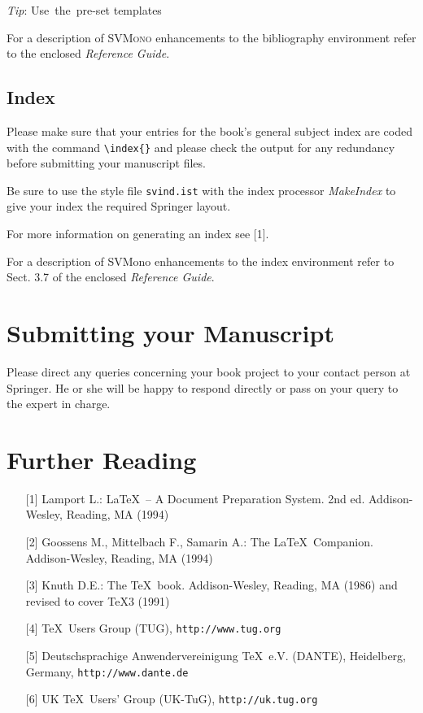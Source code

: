 \documentclass[graybox]{svmono}
\begin{document}
\vspace*{-4.5pc}
\hspace*{29.5pc}\emph{Tip}:
\hspace*{29.5pc}\mbox{Use the pre-set}
\hspace*{29.5pc}\mbox{templates}

\vspace*{3pc}
For a description of \textsc{SVMono} enhancements to the bibliography environment refer to the enclosed \emph{Reference Guide}.

\subsection{Index}

Please make sure that your entries for the book's general subject index are coded with the command \verb|\index{}| and please check the output for any redundancy before submitting your manuscript files.

Be sure to use the style file \verb|svind.ist| with the index processor {\it MakeIndex} to give your index the required Springer layout.

For more information on generating an index see [1].

For a description of {\sc SVMono} enhancements to the index environment refer to Sect. 3.7 of the enclosed {\it Reference Guide}.


\section{ Submitting your Manuscript}

Please direct any queries concerning your book project to your contact person at Springer. He or she will be happy to respond directly or pass on your query to the expert  in charge.

\eject

\section*{Further Reading}

\begin{enumerate}
\item[{[1]}] Lamport L.: \LaTeX~-- A Document Preparation System. 2nd ed. Addison-Wesley, Reading, MA (1994)
\item[{[2]}] Goossens M., Mittelbach F., Samarin A.: The \LaTeX~Companion. Addison-Wesley, Reading, MA (1994)
\item[{[3]}] Knuth D.E.: The \TeX~book. Addison-Wesley, Reading, MA (1986) and revised to cover \TeX3 (1991)
\item[{[4]}] \TeX~Users Group (TUG), \texttt{http://www.tug.org}
\item[{[5]}] Deutschsprachige Anwendervereinigung \TeX~e.V. (DANTE), Heidelberg, Germany, \texttt{http://www.dante.de}
\item[{[6]}] UK \TeX~Users' Group (UK-TuG), \texttt{http://uk.tug.org}
\end{enumerate}
\end{document}
